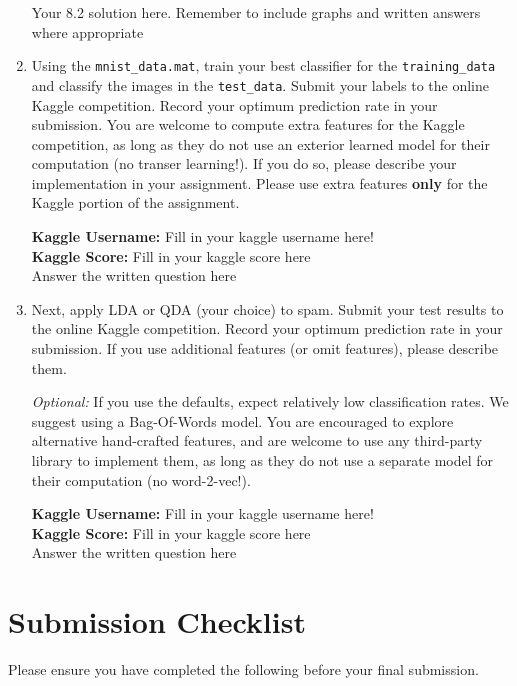 \documentclass[11pt]{article}
\begin{document}
\begin{enumerate}
\begin{enumerate}
\end{enumerate}

\begin{solution}
Your 8.2 solution here. Remember to include graphs and written answers where appropriate 
\end{solution}

\item Using the {\tt mnist\_data.mat}, train your best classifier for the {\tt training\_data} and classify the images in the {\tt test\_data}.  Submit your labels to the online Kaggle competition.  Record your optimum prediction rate in your submission.  You are welcome to compute extra features for the Kaggle competition, as long as they do not use an exterior learned model for their computation (no transer learning!).  If you do so, please describe your implementation in your assignment.
  Please use extra features {\bf only} for the Kaggle portion of the assignment.

\begin{solution}
\textbf{Kaggle Username:} Fill in your kaggle username here!\\
\textbf{Kaggle Score:} Fill in your kaggle score here\\
Answer the written question here 
\end{solution}

\item Next, apply LDA or QDA (your choice) to spam. Submit your test results to the online Kaggle competition. Record your optimum prediction rate in your submission.  If you use additional features (or omit features), please describe them.

\emph{Optional:}  If you use the defaults, expect relatively low classification rates.  We suggest using a Bag-Of-Words model. You are encouraged to explore alternative hand-crafted features, and are welcome to use any third-party library to implement them, as long as they do not use a separate model for their computation (no word-2-vec!).

\begin{solution}
\textbf{Kaggle Username:} Fill in your kaggle username here!\\
\textbf{Kaggle Score:} Fill in your kaggle score here\\
Answer the written question here 
\end{solution}

\end{enumerate}
\pagebreak
\section*{Submission Checklist}
Please ensure you have completed the following before your final submission.
\end{document}
